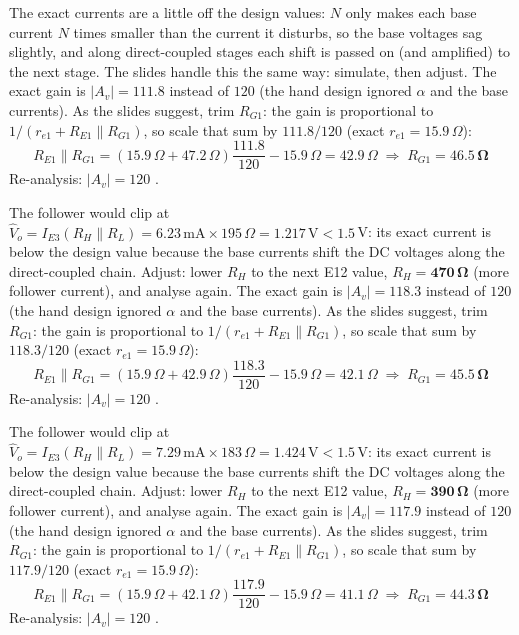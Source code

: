 \documentclass[11pt]{article}
\begin{document}
The exact currents are a little off the design values: $N$ only makes each base current $N$ times smaller than the current it disturbs, so the base voltages sag slightly, and along direct-coupled stages each shift is passed on (and amplified) to the next stage. The slides handle this the same way: simulate, then adjust. The exact gain is $|A_v| = 111.8$ instead of $120$ (the hand design ignored $\alpha$ and the base currents). As the slides suggest, trim $R_{G1}$: the gain is proportional to $1/(r_{e1} + R_{E1}\|R_{G1})$, so scale that sum by $111.8/120$ (exact $r_{e1} = 15.9\,\Omega$):\[R_{E1}\|R_{G1} = (15.9\,\Omega + 47.2\,\Omega)\frac{111.8}{120} - 15.9\,\Omega = 42.9\,\Omega \;\Rightarrow\; R_{G1} = \mathbf{46.5\,\Omega}\]Re-analysis: $|A_v| = 120$ \checkmark. \par The follower would clip at $\hat V_o = I_{E3}(R_H\|R_L) = 6.23\,\mathrm{m}\mathrm{A}\times195\,\Omega = 1.217\,\mathrm{V} < 1.5$\,V: its exact current is below the design value because the base currents shift the DC voltages along the direct-coupled chain. Adjust: lower $R_H$ to the next E12 value, $R_H = \mathbf{470\,\Omega}$ (more follower current), and analyse again. The exact gain is $|A_v| = 118.3$ instead of $120$ (the hand design ignored $\alpha$ and the base currents). As the slides suggest, trim $R_{G1}$: the gain is proportional to $1/(r_{e1} + R_{E1}\|R_{G1})$, so scale that sum by $118.3/120$ (exact $r_{e1} = 15.9\,\Omega$):\[R_{E1}\|R_{G1} = (15.9\,\Omega + 42.9\,\Omega)\frac{118.3}{120} - 15.9\,\Omega = 42.1\,\Omega \;\Rightarrow\; R_{G1} = \mathbf{45.5\,\Omega}\]Re-analysis: $|A_v| = 120$ \checkmark. \par The follower would clip at $\hat V_o = I_{E3}(R_H\|R_L) = 7.29\,\mathrm{m}\mathrm{A}\times183\,\Omega = 1.424\,\mathrm{V} < 1.5$\,V: its exact current is below the design value because the base currents shift the DC voltages along the direct-coupled chain. Adjust: lower $R_H$ to the next E12 value, $R_H = \mathbf{390\,\Omega}$ (more follower current), and analyse again. The exact gain is $|A_v| = 117.9$ instead of $120$ (the hand design ignored $\alpha$ and the base currents). As the slides suggest, trim $R_{G1}$: the gain is proportional to $1/(r_{e1} + R_{E1}\|R_{G1})$, so scale that sum by $117.9/120$ (exact $r_{e1} = 15.9\,\Omega$):\[R_{E1}\|R_{G1} = (15.9\,\Omega + 42.1\,\Omega)\frac{117.9}{120} - 15.9\,\Omega = 41.1\,\Omega \;\Rightarrow\; R_{G1} = \mathbf{44.3\,\Omega}\]Re-analysis: $|A_v| = 120$ \checkmark. \begin{itemize}[leftmargin=*,itemsep=2pt]

\end{itemize}
\end{document}
